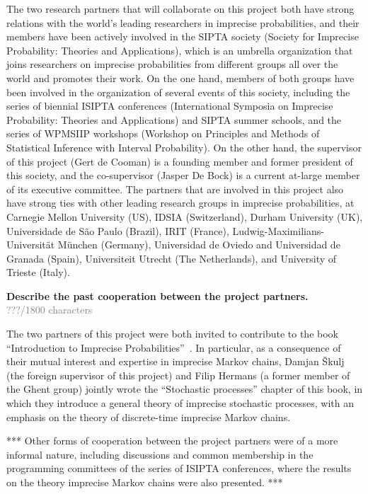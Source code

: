 \documentclass[11pt,dvipsnames,usenames,a4paper]{article}
\begin{document}
The two research partners that will collaborate on this project both have strong relations with the world's leading researchers in imprecise probabilities, and their members have been actively involved in the SIPTA society (Society for Imprecise Probability: Theories and Applications), which is an umbrella organization that joins researchers on imprecise probabilities from different groups all over the world and promotes their work. On the one hand, members of both groups have been involved in the organization of several events of this society, including the series of biennial ISIPTA conferences (International Symposia on Imprecise Probability: Theories and Applications) and SIPTA summer schools, and the series of WPMSIIP workshops (Workshop on Principles and Methods of Statistical Inference with Interval Probability). On the other hand, the supervisor of this project (Gert de Cooman) is a founding member and former president of this society, and the co-supervisor (Jasper De Bock) is a current at-large member of its executive committee. 
The partners that are involved in this project also have strong ties with other leading research groups in imprecise probabilities, at Carnegie Mellon University (US), IDSIA (Switzerland), Durham University (UK), Universidade de S\~ao Paulo (Brazil), IRIT (France), Ludwig-Maximilians-Universit\"at M\"unchen (Germany), Universidad de Oviedo and Universidad de Granada (Spain), Universiteit Utrecht (The Netherlands), and University of Trieste (Italy). 







\textbf{Describe the past cooperation between the project partners.}\\
\textcolor{Gray}{???/1800 characters}

The two partners of this project were both invited to contribute to the book ``Introduction to Imprecise Probabilities''~\cite{augustin2013:itip}. In particular, as a consequence of their mutual interest and expertise in imprecise Markov chains, Damjan Škulj (the foreign supervisor of this project) and Filip Hermans (a former member of the Ghent group) jointly wrote the ``Stochastic processes'' chapter of this book, in which they introduce a general theory of imprecise stochastic processes, with an emphasis on the theory of discrete-time imprecise Markov chains.

*** Other forms of cooperation between the project partners were of a more informal nature, including discussions and common membership in the programming committees of the series of ISIPTA conferences, where the results on the theory imprecise Markov chains were also presented. ***
\end{document}
